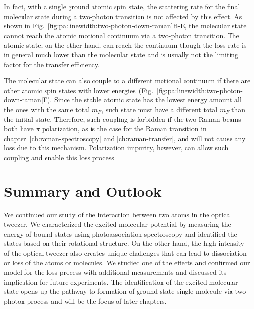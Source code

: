 In fact, with a single ground atomic spin state, the scattering rate for the final molecular
state during a two-photon transition is not affected by this effect.
As shown in Fig.~\ref{fig:pa:linewidth:two-photon-down-raman}B-E,
the molecular state cannot reach the atomic motional continuum via a two-photon transition.
The atomic state, on the other hand, can reach the continuum though the loss rate is in general
much lower than the molecular state
and is usually not the limiting factor for the transfer efficiency.

The molecular state can also couple to a different motional continuum if there are other
atomic spin states with lower energies~(Fig.~\ref{fig:pa:linewidth:two-photon-down-raman}F).
Since the stable atomic state has the lowest energy amount all the ones with the same total $m_F$,
such state must have a different total $m_F$ than the initial state.
Therefore, such coupling is forbidden if the two Raman beams both have $\pi$ polarization,
as is the case for the Raman transition in chapter~\ref{ch:raman-spectroscopy}
and \ref{ch:raman-transfer}, and will not cause any loss due to this mechanism.
Polarization impurity, however, can allow such coupling and enable this loss process.

\section{Summary and Outlook}
\label{ch:pa:summary}
We continued our study of the interaction between two atoms in the optical tweezer.
We characterized the excited molecular potential by measuring
the energy of bound states using photoassociation spectroscopy
and identified the states based on their rotational structure.
On the other hand, the high intensity of the optical tweezer
also creates unique challenges that can lead to dissociation or loss of the atoms or molecules.
We studied one of the effects and confirmed our model for the loss process with
additional measurements and discussed its implication for future experiments.
The identification of the excited molecular state opens up the pathway
to formation of ground state single molecule via two-photon process
and will be the focus of later chapters.

